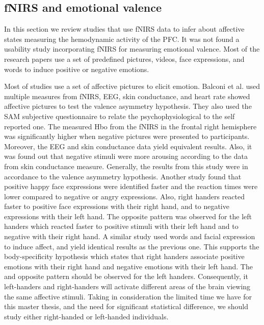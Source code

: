 \documentclass[a4paper]{report}
\begin{document}
		\subsection{fNIRS and emotional valence}
			In this section we review studies that use fNIRS data to infer about affective states measuring the hemodynamic activity of the PFC. It was not found a usability study incorporating fNIRS for measuring emotional valence. Most of the research papers use a set of predefined pictures, videos, face expressions, and words to induce positive or negative emotions.
			
			Most of studies use a set of affective pictures\cite{lang1997international} to elicit emotion. Balconi et al.\cite{balconi2015hemodynamic} used multiple measures from fNIRS, EEG, skin conductance, and heart rate showed affective pictures to test the valence asymmetry hypothesis. They also used the SAM subjective questionnaire to relate the psychophysiological to the self reported one. The measured Hbo from the fNIRS in the frontal right hemisphere was significantly higher when negative pictures were presented to participants. Moreover, the EEG and skin conductance data yield equivalent results. Also, it was found out that negative stimuli were more arousing according to the data from skin conductance measure. Generally, the results from this study were in accordance to the valence asymmetry hypothesis.	Another study found that positive happy face expressions were identified faster and the reaction times were lower compared to negative or angry expressions\cite{root2006left}. Also, right handers reacted faster to positive face expressions with their right hand, and to negative expressions with their left hand. The opposite pattern was observed for the left handers which reacted faster to positive stimuli with their left hand and to negative with their right hand. A similar study\cite{kong2013space} used words and facial expression to induce affect, and yield identical results as the previous one. This supports the body-specificity hypothesis\cite{casasanto2009embodiment} which states that right handers associate positive emotions with their right hand and negative emotions with their left hand. The and opposite pattern should be observed for the left handers. Consequently, it left-handers and right-handers will activate different areas of the brain viewing the same affective stimuli. Taking in consideration the limited time we have for this master thesis, and the need for significant statistical difference, we should study either right-handed or left-handed individuals.
			
\end{document}
